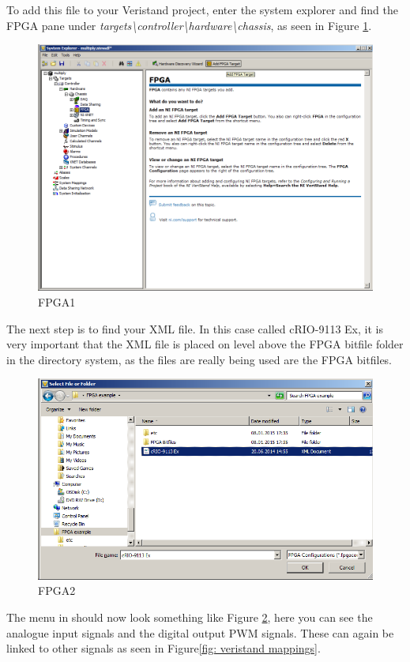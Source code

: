 To add this file to your Veristand project, enter the system explorer and find the FPGA pane under \textit{targets\textbackslash{}controller\textbackslash{}hardware\textbackslash{}chassis}, as seen in Figure \ref{fig: fpga1}. 
\begin{figure}[htb!]
	\centering \includegraphics[scale=0.45]{fig/fpga1}
	\caption{FPGA1}
	\label{fig: fpga1}
\end{figure}
The next step is to find your XML file. In this case called cRIO-9113 Ex, it is very important that the XML file is placed on level above the FPGA bitfile folder in the directory system, as the files are really being used are the FPGA bitfiles.
\begin{figure}[htb!]
	\centering \includegraphics[scale=0.45]{fig/fpga2}
	\caption{FPGA2}
	\label{fig: fpga2}
\end{figure}
The menu in should now look something like Figure \ref{fig: fpga2}, here you can see the analogue input signals and the digital output PWM signals. These can again be linked to other signals as seen in Figure\ref{fig: veristand mappings}.
